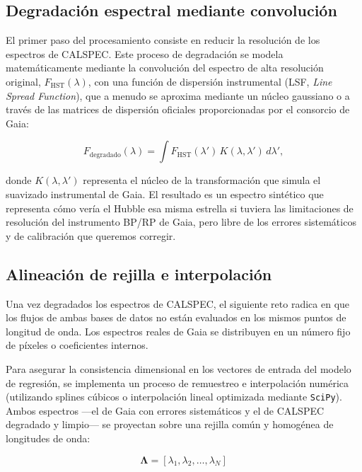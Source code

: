\documentclass{article}
\begin{document}
\subsection{Degradación espectral mediante convolución}

El primer paso del procesamiento consiste en reducir la resolución de los espectros de CALSPEC. Este proceso de degradación se modela matemáticamente mediante la convolución del espectro de alta resolución original, $F_{\text{HST}}(\lambda)$, con una función de dispersión instrumental (LSF, \textit{Line Spread Function}), que a menudo se aproxima mediante un núcleo gaussiano o a través de las matrices de dispersión oficiales proporcionadas por el consorcio de Gaia:

\begin{equation}
F_{\text{degradado}}(\lambda) = \int F_{\text{HST}}(\lambda') \, K(\lambda, \lambda') \, d\lambda',
\end{equation}

donde $K(\lambda, \lambda')$ representa el núcleo de la transformación que simula el suavizado instrumental de Gaia. El resultado es un espectro sintético que representa cómo vería el Hubble esa misma estrella si tuviera las limitaciones de resolución del instrumento BP/RP de Gaia, pero libre de los errores sistemáticos y de calibración que queremos corregir.

\subsection{Alineación de rejilla e interpolación}

Una vez degradados los espectros de CALSPEC, el siguiente reto radica en que los flujos de ambas bases de datos no están evaluados en los mismos puntos de longitud de onda. Los espectros reales de Gaia se distribuyen en un número fijo de píxeles o coeficientes internos.

Para asegurar la consistencia dimensional en los vectores de entrada del modelo de regresión, se implementa un proceso de remuestreo e interpolación numérica (utilizando splines cúbicos o interpolación lineal optimizada mediante \texttt{SciPy}). Ambos espectros —el de Gaia con errores sistemáticos y el de CALSPEC degradado y limpio— se proyectan sobre una rejilla común y homogénea de longitudes de onda:

\begin{equation}
\mathbf{\Lambda} = [\lambda_1, \lambda_2, \dots, \lambda_N]
\end{equation}
\end{document}
